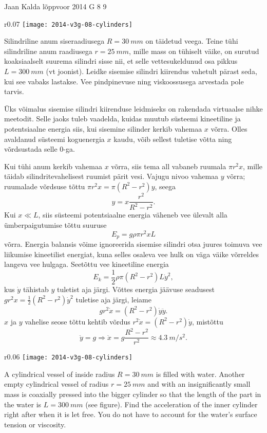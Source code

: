 {Jaan Kalda} %
{lõppvoor} %
{2014} %
{G 8} %
{9} %
{
\ifStatement
\begin{wrapfigure}{r}{0.07\textwidth}%
\vspace{-15pt}
\texttt{[image: 2014-v3g-08-cylinders]}
\end{wrapfigure}

Silindriline anum siseraadiusega $R = \SI{30}{mm}$ on täidetud veega. Teine tühi silindriline anum raadiusega $r =\SI{25}{mm}$, mille mass on tühiselt väike, on surutud koaksiaalselt suurema silindri sisse nii, et selle vettesukeldunud osa pikkus $L = \SI{300}{mm}$ (vt joonist). Leidke sisemise silindri kiirendus vahetult pärast seda, kui see vabaks lastakse. Vee pindpinevuse ning viskoossusega arvestada pole tarvis.
\fi


\ifHint
Üks võimalus sisemise silindri kiirenduse leidmiseks on rakendada virtuaalse nihke meetodit. Selle jaoks tuleb vaadelda, kuidas muutub süsteemi kineetiline ja potentsiaalne energia siis, kui sisemine silinder kerkib vahemaa $x$ võrra. Olles avaldanud süsteemi koguenergia $x$ kaudu, võib sellest tuletise võtta ning võrdsustada selle \num{0}-ga.
\fi


\ifSolution
Kui tühi anum kerkib vahemaa $x$ võrra, siis tema all vabaneb ruumala
$\pi r^2 x$, mille täidab silindritevahelisest ruumist
pärit vesi.  Vajugu nivoo vahemaa $y$ võrra; ruumalade võrdsuse tõttu
$\pi r^2 x = \pi (R^2-r^2) y$, seega
$$y=x\frac {r^2}{R^2-r^2}.$$
Kui $x\ll L$, siis süsteemi potentsiaalne energia väheneb vee ülevalt
alla ümberpaigutumise tõttu suuruse
$$E_p=g\rho \pi r^2 x L$$
võrra.
Energia balansis võime ignoreerida sisemise silindri otsa juures
toimuva vee liikumise kineetilist energiat, kuna selles osaleva vee hulk on väga väike võrreldes langeva vee hulgaga.
Seetõttu vee kineetiline energia
$$E_k=\frac 12 \rho \pi (R^2-r^2) L\dot y^2,$$
kus $\dot y$ tähistab $y$ tuletist aja järgi.
Võttes energia jäävuse seadusest  $gr^2x=\frac 12(R^2-r^2)\dot y^2$
tuletise aja järgi, leiame
$$gr^2\dot x=(R^2-r^2)\dot y\ddot y.$$
$x$ ja $y$ vahelise seose tõttu kehtib võrdus $r^2\dot x=(R^2-r^2)\dot
y$, mistõttu
$$\ddot y = g\Rightarrow \ddot x = g\frac
{R^2-r^2}{r^2}\approx\SI{4,3}{m/s^2}.$$
\fi


\ifEngStatement
\begin{wrapfigure}{r}{0.06\textwidth}%
\vspace{-15pt}
\texttt{[image: 2014-v3g-08-cylinders]}
\end{wrapfigure}
A cylindrical vessel of inside radius $R = \SI{30}{mm}$ is filled with water. Another empty cylindrical vessel of radius $r =\SI{25}{mm}$ and with an insignificantly small mass is coaxially pressed into the bigger cylinder so that the length of the part in the water is $L = \SI{300}{mm}$ (see figure). Find the acceleration of the inner cylinder right after when it is let free. You do not have to account for the water’s surface tension or viscosity.
\fi


}
